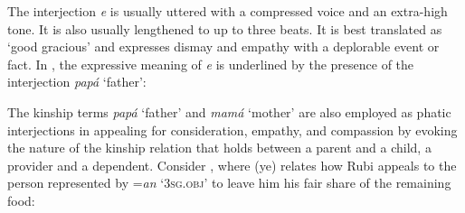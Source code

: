 \ea%
    \label{ex:key:1648}
\z\z

The interjection \textit{e} is usually uttered with a compressed voice and an extra-high tone. It is also usually lengthened to up to three beats. It is best translated as ‘good gracious’ and expresses dismay and empathy with a deplorable event or fact. In , the expressive meaning of \textit{e} is underlined by the presence of the interjection \textit{papá} ‘father’:


\ea%
    \label{ex:key:1649}
\z\z

The kinship terms \textit{papá} ‘father’ and \textit{mamá} ‘mother’ are also employed as phatic interjections in appealing for consideration, empathy, and compassion by evoking the nature of the kinship relation that holds between a parent and a child, a provider and a dependent. Consider , where (ye) relates how Rubi appeals to the person represented by =\textit{a}\textit{n} ‘\textsc{3sg.obj}’ to leave him his fair share of the remaining food:


\ea%
    \label{ex:key:1650}
\z\z

